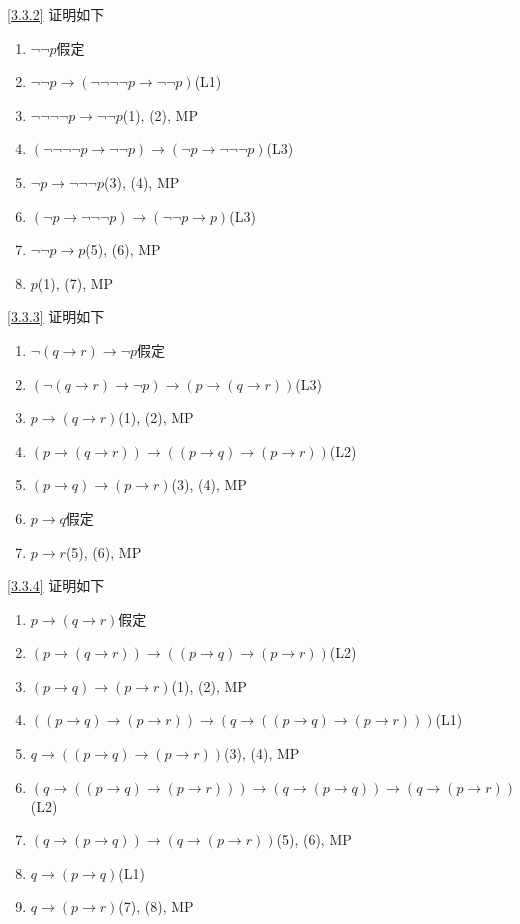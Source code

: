 \documentclass[boxes]{homework}
\begin{document}
\begin{solution}
    \ref{3.3.2}
    证明如下
    \begin{enumerate}[label = (\arabic*), itemsep = 0em, topsep = .5em, partopsep = .5em]\label{sol:4.1}
        \item $\lnot\lnot p$\hfill 假定
        \item $\lnot\lnot p\to (\lnot\lnot\lnot\lnot p\to \lnot\lnot p)$\hfill (L1)
        \item $\lnot\lnot\lnot\lnot p\to \lnot\lnot p$\hfill (1), (2), MP
        \item $(\lnot\lnot\lnot\lnot p\to \lnot\lnot p)\to (\lnot p\to \lnot\lnot\lnot p)$\hfill (L3)
        \item $\lnot p\to \lnot\lnot\lnot p$\hfill (3), (4), MP
        \item $(\lnot p\to \lnot\lnot\lnot p)\to (\lnot\lnot p\to p)$\hfill (L3)
        \item $\lnot\lnot p\to p$\hfill (5), (6), MP
        \item $p$\hfill (1), (7), MP
    \end{enumerate}
    \ref{3.3.3}
    证明如下
    \begin{enumerate}[label = (\arabic*), itemsep = 0em, topsep = .5em, partopsep = .5em]
        \item $\lnot (q\to r)\to \lnot p$\hfill 假定
        \item $(\lnot (q\to r)\to \lnot p)\to(p\to(q\to r))$\hfill (L3)
        \item $p\to(q\to r)$\hfill (1), (2), MP
        \item $(p\to(q\to r))\to((p\to q)\to (p\to r))$\hfill (L2)
        \item $(p\to q)\to (p\to r)$\hfill (3), (4), MP
        \item $p\to q$\hfill 假定
        \item $p\to r$\hfill (5), (6), MP
    \end{enumerate}
    \ref{3.3.4}
    证明如下
    \begin{enumerate}[label = (\arabic*), itemsep = 0em, topsep = .5em, partopsep = .5em]
        \item $p\to (q\to r)$\hfill 假定
        \item $(p\to (q\to r))\to((p\to q)\to(p\to r))$\hfill (L2)
        \item $(p\to q)\to(p\to r)$\hfill (1), (2), MP
        \item $((p\to q)\to(p\to r))\to(q\to ((p\to q)\to (p\to r)))$\hfill (L1)
        \item $q\to ((p\to q)\to (p\to r))$\hfill (3), (4), MP
        \item $(q\to ((p\to q)\to (p\to r)))\to (q\to (p\to q))\to (q\to (p\to r))$ \hfill (L2)
        \item $(q\to (p\to q))\to (q\to (p\to r))$\hfill (5), (6), MP
        \item $q\to (p\to q)$\hfill (L1)
        \item $q\to (p\to r)$\hfill (7), (8), MP
    \end{enumerate}
\end{solution}
\end{document}
